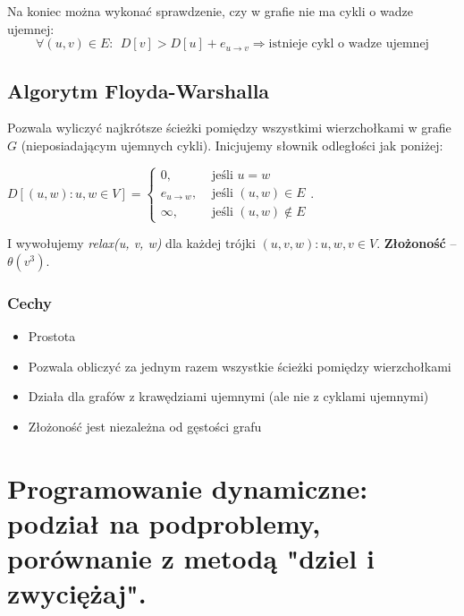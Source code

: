 \documentclass[main.tex]{subfiles}
\begin{document}
    Na koniec można wykonać sprawdzenie, czy w grafie nie ma cykli o wadze ujemnej:
    \[ \forall (u,v) \in E: ~~ D[v] > D[u] + e_{u \rightarrow v} \Rightarrow \text{istnieje cykl o wadze ujemnej}\]


    \subsection{Algorytm Floyda-Warshalla}

    Pozwala wyliczyć najkrótsze ścieżki pomiędzy wszystkimi wierzchołkami w grafie $G$ (nieposiadającym ujemnych cykli).
    Inicjujemy słownik odległości jak poniżej:

    $D[(u, w) : u, w \in V] =
    \begin{cases}
        0, &\text{ jeśli } u = w\\
        e_{u \rightarrow w}, &\text{ jeśli } (u, w) \in E\\
        \infty, &\text{ jeśli } (u, w) \notin E
    \end{cases}$.

    \noindent I wywołujemy \textit{relax(u, v, w)} dla każdej trójki $(u, v, w) : u, w, v \in V$.
    \textbf{Złożoność} -- $\theta(v^3)$.

    \subsubsection{Cechy}
    \begin{itemize}[noitemsep]
        \item Prostota
        \item Pozwala obliczyć za jednym razem wszystkie ścieżki pomiędzy wierzchołkami
        \item Działa dla grafów z krawędziami ujemnymi (ale nie z cyklami ujemnymi)
        \item Złożoność jest niezależna od gęstości grafu
    \end{itemize}

    \newpage


    \section{Programowanie dynamiczne: podział na podproblemy, porównanie z metodą "dziel i zwyciężaj".}
\end{document}
